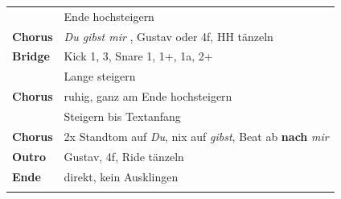\begin{tabular}{p{1.6cm}l}
	                & Ende hochsteigern                                                                       \\
	\textbf{Chorus} & \textit{Du gibst mir} \highlight{Break}\color{black}, Gustav oder 4f, HH tänzeln                     \\
	\textbf{Bridge} & Kick 1, 3, Snare 1, 1+, 1a, 2+                                                          \\
	                & Lange steigern                                                                          \\
	\textbf{Chorus} & ruhig, ganz am Ende hochsteigern                                                        \\
	                & Steigern bis Textanfang                                                                 \\
	\textbf{Chorus} & 2x Standtom auf \textit{Du}, nix auf \textit{gibst}, Beat ab \textbf{nach} \textit{mir} \\
	\textbf{Outro}  & Gustav, 4f, Ride tänzeln                                                                \\
	\textbf{Ende}   & direkt, kein Ausklingen                                                                 \\
	                &                                                                                         \\
\end{tabular}

